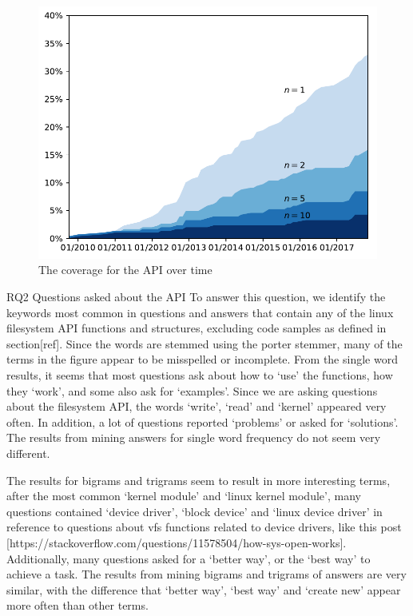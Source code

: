 \begin{figure}
  \includegraphics{scripts/figures/1-3-coverage-by-time}
  \caption{The coverage for the API over time}
  \label{fig:coveragetime}
\end{figure}


RQ2
Questions asked about the API
To answer this question, we identify the keywords most common in questions and answers that contain any of the linux filesystem API functions and structures, excluding code samples as defined in section[ref]. Since the words are stemmed using the porter stemmer, many of the terms in the figure appear to be misspelled or incomplete.
From the single word results, it seems that most questions ask about how to `use' the functions, how they `work', and some also ask for `examples'. Since we are asking questions about the filesystem API, the words `write', `read' and `kernel' appeared very often. In addition, a lot of questions reported `problems' or asked for `solutions'. The results from mining answers for single word frequency do not seem very different.

The results for bigrams and trigrams seem to result in more interesting terms, after the most common `kernel module' and `linux kernel module', many questions contained `device driver', `block device' and `linux device driver' in reference to questions about vfs functions related to device drivers, like this post [https://stackoverflow.com/questions/11578504/how-sys-open-works]. Additionally, many questions asked for a `better way', or the `best way' to achieve a task.
The results from mining bigrams and trigrams of answers are very similar, with the difference that `better way', `best way' and `create new' appear more often than other terms.

